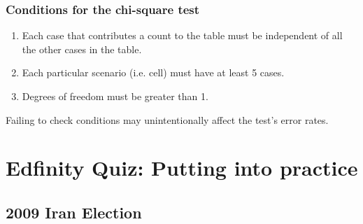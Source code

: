 \documentclass[slidestop,compress,mathserif]{beamer}
\begin{document}

\begin{frame}
\frametitle{Conditions for the chi-square test}

\begin{enumerate}

\item {} Each case that contributes a count to the table must be independent of all the other cases in the table.

\pause

\item {} Each particular scenario (i.e. cell) must have at least 5  cases.

\pause

\item {} Degrees of freedom must be greater than 1.

\end{enumerate}

\pause

Failing to check conditions may unintentionally affect the test's error rates.

\end{frame}


\section{Edfinity Quiz: Putting into practice}


\subsection{2009 Iran Election}

\end{document}

